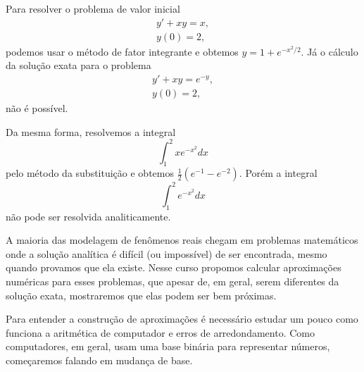 \documentclass[main.tex]{subfiles}
\begin{document}
Para resolver o problema de valor inicial 
$$
\begin{array}{l}
y'+xy=x,\\
y(0)=2,
\end{array}
$$
podemos usar o método de fator integrante e obtemos $y=1+e^{-x^2/2}$. Já o cálculo da solução exata para o problema 
$$
\begin{array}{l}
y'+xy=e^{-y},\\
y(0)=2,
\end{array}
$$
não é possível.

Da mesma forma, resolvemos a integral
$$
\int_1^2xe^{-x^2}dx
$$
pelo método da substituição e obtemos $\frac{1}{2}(e^{-1}-e^{-2})$. Porém a integral
$$
\int_1^2 e^{-x^2} dx
$$
não pode ser resolvida analiticamente.

A maioria das modelagem de fenômenos reais chegam em problemas matemáticos onde a solução analítica é difícil (ou impossível) de ser encontrada, mesmo quando provamos que ela existe. Nesse curso propomos calcular aproximações numéricas para esses problemas, que apesar de, em geral, serem diferentes da solução exata, mostraremos que elas podem ser bem próximas.

Para entender a construção de aproximações é necessário estudar um pouco como funciona a aritmética de computador e erros de arredondamento. Como computadores, em geral, usam uma base binária para representar números, começaremos falando em mudança de base.
\end{document}
